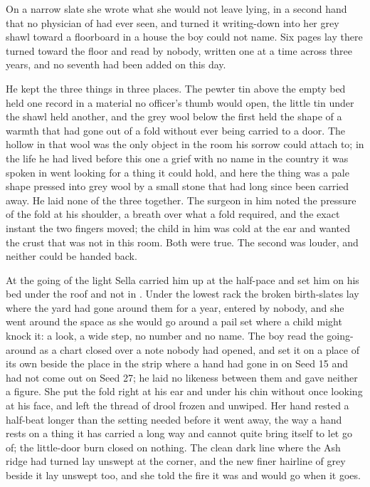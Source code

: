 On a narrow slate she wrote what she would not leave lying, in a second hand that no physician of  had ever seen, and turned it writing-down into her grey shawl toward a floorboard in a house the boy could not name. Six pages lay there turned toward the floor and read by nobody, written one at a time across three years, and no seventh had been added on this day.

He kept the three things in three places. The pewter tin above the empty bed held one record in a material no officer's thumb would open, the little tin under the shawl held another, and the grey wool below the first held the shape of a warmth that had gone out of a fold without ever being carried to a door. The hollow in that wool was the only object in the room his sorrow could attach to; in the life he had lived before this one a grief with no name in the country it was spoken in went looking for a thing it could hold, and here the thing was a pale shape pressed into grey wool by a small stone that had long since been carried away. He laid none of the three together. The surgeon in him noted the pressure of the fold at his shoulder, a breath over what a fold required, and the exact instant the two fingers moved; the child in him was cold at the ear and wanted the crust that was not in this room. Both were true. The second was louder, and neither could be handed back.

\scenebreak

At the going of the light Sella carried him up  at the half-pace and set him on his bed under the roof and not in . Under the lowest rack the broken birth-slates lay where the yard had gone around them for a year, entered by nobody, and she went around the space as she would go around a pail set where a child might knock it: a look, a wide step, no number and no name. The boy read the going-around as a chart closed over a note nobody had opened, and set it on a place of its own beside the place in the strip where a hand had gone in on Seed 15 and had not come out on Seed 27; he laid no likeness between them and gave neither a figure. She put the fold right at his ear and under his chin without once looking at his face, and left the thread of drool frozen and unwiped. Her hand rested a half-beat longer than the setting needed before it went away, the way a hand rests on a thing it has carried a long way and cannot quite bring itself to let go of; the little-door burn closed on nothing. The clean dark line where the Ash ridge had turned lay unswept at the corner, and the new finer hairline of grey beside it lay unswept too, and she told the fire it was  and would go when it goes.

